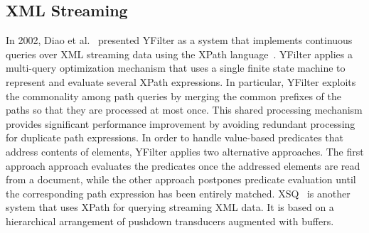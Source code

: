\subsection{XML Streaming}\label{sec:xml} %


In 2002, Diao et al.~\cite{diao_et_al_2002,diao2003high} presented YFilter as a system that implements
continuous queries over XML streaming data using the XPath language~\cite{clark_derose_1999}. YFilter applies
a multi-query optimization mechanism that uses a single
finite state machine to represent and evaluate several XPath
expressions. In particular, YFilter exploits the commonality among path queries by merging the common prefixes
of the paths so that they are processed at most once. This  shared processing mechanism provides significant performance
improvement by avoiding redundant processing for duplicate path expressions. In order to handle value-based predicates that address contents of elements, YFilter applies two alternative approaches. The first approach approach evaluates the  predicates once the addressed elements are read from a document, while the other approach postpones predicate evaluation until the corresponding path expression has been entirely matched.
XSQ~\cite{peng_chawathe_2003} is another system that uses XPath for querying streaming XML data. It is based on a hierarchical arrangement of pushdown transducers
augmented with buffers.

\iffalse
\begin{figure}[!h]
\begin{lstlisting}
CREATE ~\textit{cq\_name}~
         ~\textit{xml\_ql\_query}~
     DO ~\textit{action}~
  {START ~\textit{start\_time}~}
  {EVERY ~\textit{time\_interval}~}
  {EXPIRE ~\textit{expiration\_time}~}
\end{lstlisting}
\vspace*{-4mm}
\caption{\label{fig:Niagra}NiagaraCQ code example.}
\end{figure}
\fi

